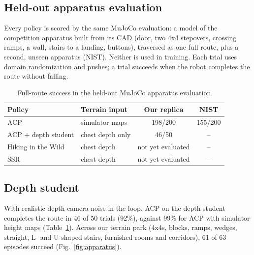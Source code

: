\documentclass[journal]{IEEEtran}
\begin{document}
\subsection{Held-out apparatus evaluation}
Every policy is scored by the same MuJoCo evaluation: a model of the competition apparatus built from its CAD (door, two
4x4 stepovers, crossing ramps, a wall, stairs to a landing, buttons), traversed as one full route, plus a second, unseen
apparatus (NIST). Neither is used in training. Each trial uses domain randomization and pushes;
a trial succeeds when the robot completes the route without falling.

\begin{table}[!t]
\renewcommand{\arraystretch}{1.1}
\caption{Full-route success in the held-out MuJoCo apparatus evaluation}
\label{tab:results}
\centering
\tabcolsep=0.08cm
\begin{tabular}{|l|l|c|c|}
\hline
Policy & Terrain input & Our replica & NIST \\
\hline
ACP & simulator maps & 198/200 & 155/200 \\
ACP + depth student & chest depth only & 46/50 & -- \\
Hiking in the Wild & chest depth & not yet evaluated & -- \\
SSR & chest depth & not yet evaluated & -- \\
\hline
\end{tabular}
\end{table}

\subsection{Depth student}
With realistic depth-camera noise in the loop, ACP on the depth student completes the route in 46 of 50 trials (92\%),
against 99\% for ACP with simulator height maps (Table~\ref{tab:results}). Across our terrain park (4x4s, blocks, ramps,
wedges, straight, L- and U-shaped stairs, furnished rooms and corridors), 61 of 63 episodes succeed
(Fig.~\ref{fig:apparatus}).
\end{document}
